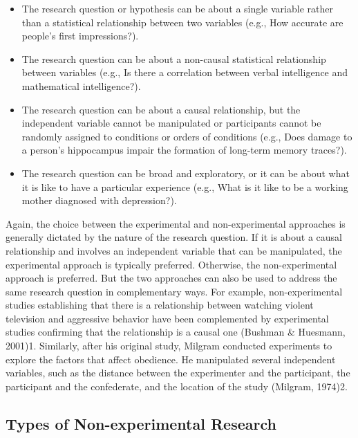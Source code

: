 \begin{itemize}

\item The research question or hypothesis can be about a single variable rather than a statistical relationship between two variables (e.g., How accurate are people's first impressions?).

\item The research question can be about a non-causal statistical relationship between variables (e.g., Is there a correlation between verbal intelligence and mathematical intelligence?).

\item The research question can be about a causal relationship, but the independent variable cannot be manipulated or participants cannot be randomly assigned to conditions or orders of conditions (e.g., Does damage to a person's hippocampus impair the formation of long-term memory traces?).

\item The research question can be broad and exploratory, or it can be about what it is like to have a particular experience (e.g., What is it like to be a working mother diagnosed with depression?).

\end{itemize}

Again, the choice between the experimental and non-experimental approaches is generally dictated by the nature of the research question. If it is about a causal relationship and involves an independent variable that can be manipulated, the experimental approach is typically preferred. Otherwise, the non-experimental approach is preferred. But the two approaches can also be used to address the same research question in complementary ways. For example, non-experimental studies establishing that there is a relationship between watching violent television and aggressive behavior have been complemented by experimental studies confirming that the relationship is a causal one (Bushman \& Huesmann, 2001)1. Similarly, after his original study, Milgram conducted experiments to explore the factors that affect obedience. He manipulated several independent variables, such as the distance between the experimenter and the participant, the participant and the confederate, and the location of the study (Milgram, 1974)2.

\subsection{Types of Non-experimental Research}


